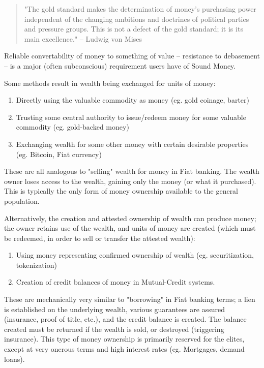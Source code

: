 \documentclass[11pt]{article}
\begin{document}
\begin{quote}
"The gold standard makes the determination of money's purchasing power independent of the changing
ambitions and doctrines of political parties and pressure groups. This is not a defect of the gold
standard; it is its main excellence." -- Ludwig von Mises
\end{quote}

Reliable convertability of money to something of value -- resistance to debasement -- is a major
(often subconscious) requirement users have of Sound Money.

Some methods result in wealth being exchanged for units of money:

\begin{enumerate}
\item Directly using the valuable commodity as money (eg. gold coinage, barter)
\item Trusting some central authority to issue/redeem money for some valuable commodity (eg. gold-backed money)
\item Exchanging wealth for some other money with certain desirable properties (eg. Bitcoin, Fiat currency)
\end{enumerate}

These are all analogous to "selling" wealth for money in Fiat banking.  The wealth owner loses
access to the wealth, gaining only the money (or what it purchased).  This is typically the only
form of money ownership available to the general population.

Alternatively, the creation and attested ownership of wealth can produce money; the owner retains
use of the wealth, and units of money are created (which must be redeemed, in order to sell or
transfer the attested wealth):

\begin{enumerate}
\item Using money representing confirmed ownership of wealth (eg. securitization, tokenization)
\item Creation of credit balances of money in Mutual-Credit systems.
\end{enumerate}

These are mechanically very similar to "borrowing" in Fiat banking terms; a lien is established on
the underlying wealth, various guarantees are assured (insurance, proof of title, etc.), and the
credit balance is created.  The balance created must be returned if the wealth is sold, or
destroyed (triggering insurance).  This type of money ownership is primarily reserved for the
elites, except at very onerous terms and high interest rates (eg. Mortgages, demand loans).
\end{document}
